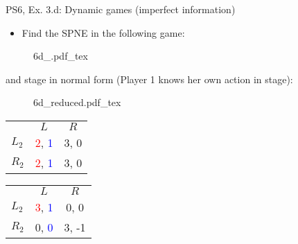 \begin{frame}{PS6, Ex. 3.d: Dynamic games (imperfect information)}
    \begin{itemize}
      \item[(d)] Find the SPNE in the following game:
    \end{itemize}
    \vspace{-4pt}
    \begin{figure}[!h]
      \center
      \def\svgwidth{.8\columnwidth}
      {6d_.pdf_tex}
    \end{figure}
    \vspace{-4pt}
     and  stage in normal form (Player 1 knows her own action in  stage):
    \vspace{-4pt}
    \begin{figure}[!h]
      \center
      \def\svgwidth{.25\columnwidth}
      {6d_reduced.pdf_tex}
    \end{figure}
    \vspace{-9pt}
    \begin{table}
      \begin{tabular}{l|c|c|}
        \multicolumn{1}{c}{} & \multicolumn{1}{c}{\color{blue}$L$} & \multicolumn{1}{c}{$R$} \\\cline{2-3}
        $L_2$ & \textcolor{red}{2}, \textcolor{blue}{1} & 3, 0 \\\cline{2-3}
        $R_2$ & \textcolor{red}{2}, \textcolor{blue}{1} & 3, 0 \\\cline{2-3}
      \end{tabular}
      \enskip
      \begin{tabular}{l|c|c|}
        \multicolumn{1}{c}{} & \multicolumn{1}{c}{\color{blue}$L$} & \multicolumn{1}{c}{$R$} \\\cline{2-3}
        $L_2$ & \textcolor{red}{3}, \textcolor{blue}{1} & 0, 0 \\\cline{2-3}
        $R_2$ & 0, \textcolor{blue}{0} & 3, -1 \\\cline{2-3}
      \end{tabular}
    \end{table}
    \vfill\null
\end{frame}

